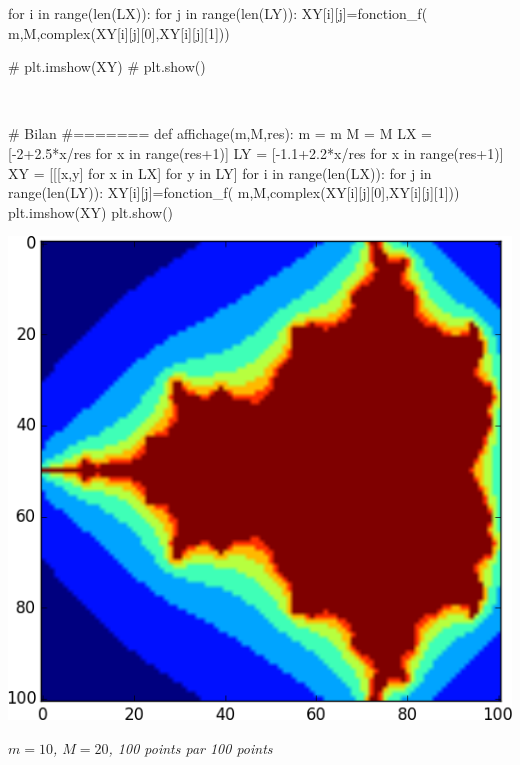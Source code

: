 \documentclass[10pt,fleqn]{article} %
\begin{document}
\begin{multicols}{2}
\begin{corrige}
\begin{python}
for i in range(len(LX)):
    for j in range(len(LY)):
        XY[i][j]=fonction_f(
        m,M,complex(XY[i][j][0],XY[i][j][1]))

# plt.imshow(XY)
# plt.show()
\end{python}
\end{corrige}

\begin{corrige}
$\quad$
\begin{python}

# Bilan 
#=======
def affichage(m,M,res):
    m = m
    M = M
    LX = [-2+2.5*x/res for x in range(res+1)]
    LY = [-1.1+2.2*x/res for x in range(res+1)]
    XY = [[[x,y] for x in LX] for y in LY]
    for i in range(len(LX)):
        for j in range(len(LY)):
            XY[i][j]=fonction_f(
                m,M,complex(XY[i][j][0],XY[i][j][1]))
    plt.imshow(XY)
    plt.show()
\end{python}
\end{corrige}

\begin{center}
\includegraphics[width=.8\linewidth]{programmes/Exercice_09/10_20_100}

\textit{$m=10$, $M=20$, 100 points par 100 points}
\end{center}


\end{multicols}
\end{document}
